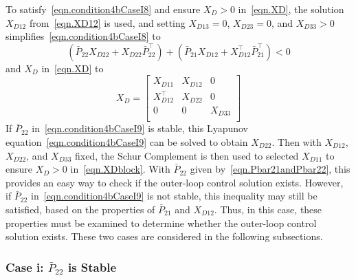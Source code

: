 \documentclass[journal]{IEEEtran}
\theoremstyle{innercustomthm}
\begin{document}
  To satisfy\ \eqref{eqn.condition4bCaseI8} and ensure $X_{D}>0$ in\ \eqref{eqn.XD}, the solution $X_{D12}$ from\ \eqref{eqn.XD12} is used, and setting $X_{D13} = 0$, $X_{D23} = 0$, and $X_{D33} > 0$ simplifies\ \eqref{eqn.condition4bCaseI8} to
  {%
    \small
    \begin{equation}
      \label{eqn.condition4bCaseI9}
      (\bar{P}_{22}X_{D22} + X_{D22}\bar{P}_{22}^{\top})
      +(\bar{P}_{21}X_{D12} + X_{D12}^{\top}\bar{P}_{21}^{\top})
      <
      0
    \end{equation}
  }%
  and $X_{D}$ in\ \eqref{eqn.XD} to
  \begin{equation}
    \label{eqn.XDblock}
    X_{D} =
    \begin{bmatrix}
      X_{D11} & X_{D12} & 0 \\
      X_{D12}^{\top} & X_{D22} & 0 \\
      0 & 0 & X_{D33} \\
    \end{bmatrix}
  \end{equation}
  If $\bar{P}_{22}$ in\ \eqref{eqn.condition4bCaseI9} is stable, this Lyapunov equation\ \eqref{eqn.condition4bCaseI9} can be solved to obtain $X_{D22}$.
  Then with $X_{D12}$, $X_{D22}$, and $X_{D33}$ fixed, the Schur Complement is then used to selected $X_{D11}$ to ensure $X_{D}>0$ in\ \eqref{eqn.XDblock}.
  With $\bar{P}_{22}$ given by\ \eqref{eqn.Pbar21andPbar22}, this provides an easy way to check if the outer-loop control solution exists.
  However, if $\bar{P}_{22}$ in\ \eqref{eqn.condition4bCaseI9} is not stable, this inequality may still be satisfied, based on the properties of $\bar{P}_{21}$ and $X_{D12}$.
  Thus, in this case, these properties must be examined to determine whether the outer-loop control solution exists.
  These two cases are considered in the following subsections.

  \subsubsection{Case i: \texorpdfstring{$\bar{P}_{22}$}{P22} is Stable}
\end{document}
